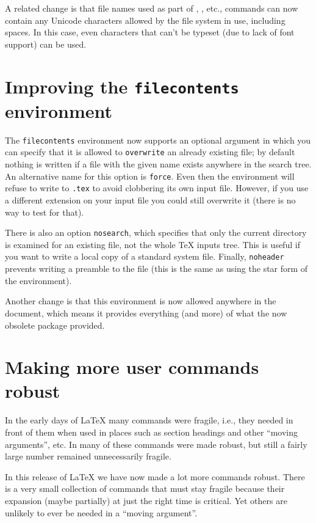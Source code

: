 \documentclass{ltnews}
\providecommand\option[1]{\texttt{#1}}
\providecommand\env[1]{\texttt{#1}}
\providecommand\env[1]{\texttt{#1}}
\begin{document}
A related change is that file names used as part of ,
, etc., commands
can now contain any
Unicode characters allowed by the file system in use,
including spaces.
In this case,
 even characters that can't be typeset
(due to lack of font support) can be used.


\section{Improving the \env{filecontents} environment}

The \env{filecontents} environment now supports an optional argument
in which you can specify that it is allowed to \option{overwrite} an
already existing file;
 by default nothing is written if a file with the given name
exists anywhere in the search tree. An alternative name for this
option is \option{force}.
Even then the environment will refuse to write
to \texttt{.tex} to avoid clobbering its own input
file. However, if you use a different extension on your input file you
could still overwrite it (there is no way to test for that).

There is also an
option
\option{nosearch},
which specifies that only the current directory is
examined for an existing file, not the whole \TeX{} inputs tree.
This is useful if you want to write a
local copy of a standard system file.
Finally, \option{noheader} prevents writing a preamble to the file
(this
is the same as using the star form of the environment).

Another change is that this
environment is
now allowed anywhere in the document,
which means
it provides everything (and more) of what the now obsolete
 package provided.



\section{Making more user commands robust}

In the early days of \LaTeX{} many commands were fragile, i.e., they
needed  in front of them when used in places such as
section headings and other \enquote{moving arguments}, etc.
In \LaTeXe{} many of these commands were made robust,
but still a fairly large number remained unnecessarily fragile.

In this release of \LaTeX{} we have now
made a lot more commands robust.
There is a very small collection of commands that must stay fragile
because their expansion (maybe partially) at just the right time is critical.
Yet others are unlikely to ever be needed in a \enquote{moving argument}.
\end{document}
